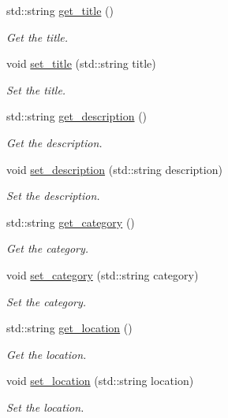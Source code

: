 \begin{DoxyCompactItemize}
std\+::string \hyperlink{class_g_a_annotation_ace301a090121c29f554bc30ed5a58d53}{get\+\_\+title} ()
\begin{DoxyCompactList}\small\item\em Get the title. \end{DoxyCompactList}\item 
void \hyperlink{class_g_a_annotation_a651fe6a772d668356be8f185175b85e2}{set\+\_\+title} (std\+::string title)
\begin{DoxyCompactList}\small\item\em Set the title. \end{DoxyCompactList}\item 
std\+::string \hyperlink{class_g_a_annotation_a1e54b4980e080e1da0c40fe84443b650}{get\+\_\+description} ()
\begin{DoxyCompactList}\small\item\em Get the description. \end{DoxyCompactList}\item 
void \hyperlink{class_g_a_annotation_acd71dcf44798cafa6e9d90d3336beb81}{set\+\_\+description} (std\+::string description)
\begin{DoxyCompactList}\small\item\em Set the description. \end{DoxyCompactList}\item 
std\+::string \hyperlink{class_g_a_annotation_a2481b693d55c11c0066e6d708e7786e5}{get\+\_\+category} ()
\begin{DoxyCompactList}\small\item\em Get the category. \end{DoxyCompactList}\item 
void \hyperlink{class_g_a_annotation_ad8ed14e09ee68b1dfcff6afada72b438}{set\+\_\+category} (std\+::string category)
\begin{DoxyCompactList}\small\item\em Set the category. \end{DoxyCompactList}\item 
std\+::string \hyperlink{class_g_a_annotation_a4c309b06dcb5dec5445e281fe21f3fd2}{get\+\_\+location} ()
\begin{DoxyCompactList}\small\item\em Get the location. \end{DoxyCompactList}\item 
void \hyperlink{class_g_a_annotation_ac7f751a3088ec6e584c3b18d100cd83a}{set\+\_\+location} (std\+::string location)
\begin{DoxyCompactList}\small\item\em Set the location. \end{DoxyCompactList}\item 

\end{DoxyCompactItemize}
